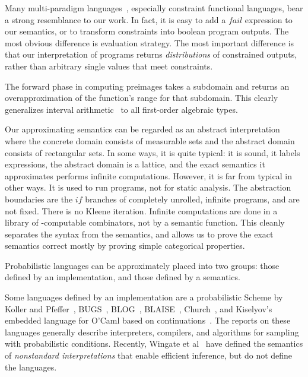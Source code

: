 Many multi-paradigm languages~\cite{cit:hanus-2007lp-multi-paradigm}, especially constraint functional languages, bear a strong resemblance to our work.
In fact, it is easy to add a $fail$ expression to our semantics, or to transform constraints into boolean program outputs.
The most obvious difference is evaluation strategy.
The most important difference is that our interpretation of programs returns \emph{distributions} of constrained outputs, rather than arbitrary single values that meet constraints.

The forward phase in computing preimages takes a subdomain and returns an overapproximation of the function's range for that subdomain.
This clearly generalizes interval arithmetic~\cite{cit:kearfott-1996eb-interval} to all first-order algebraic types.

Our approximating semantics can be regarded as an abstract interpretation~\cite{cit:cousot-1977popl-abstract-interpretation} where the concrete domain consists of measurable sets and the abstract domain consists of rectangular sets.
In some ways, it is quite typical: it is sound, it labels expressions, the abstract domain is a lattice, and the exact semantics it approximates performs infinite computations.
However, it is far from typical in other ways.
It is used to run programs, not for static analysis.
The abstraction boundaries are the $if$ branches of completely unrolled, infinite programs, and are not fixed.
There is no Kleene iteration.
Infinite computations are done in a library of \lzfclang-computable combinators, not by a semantic function.
This cleanly separates the syntax from the semantics, and allows us to prove the exact semantics correct mostly by proving simple categorical properties.

Probabilistic languages can be approximately placed into two groups: those defined by an implementation, and those defined by a semantics.

Some languages defined by an implementation are a probabilistic Scheme by Koller and Pfeffer~\cite{cit:koller-1997aaai-bayes-programs-short}, BUGS~\cite{cit:winbugs-language-short}, BLOG~\cite{cit:blog-language-short}, BLAISE~\cite{cit:blaise-language}, Church~\cite{cit:church-language-short}, and Kiselyov's embedded language for O'Caml based on continuations~\cite{cit:kiselyov-2008uai-monolingual}.
The reports on these languages generally describe interpreters, compilers, and algorithms for sampling with probabilistic conditions.
Recently, Wingate et al~\cite{cit:wingate-2011ais-lightweight,cit:wingate-2011nips-nonstandard} have defined the semantics of \emph{nonstandard interpretations} that enable efficient inference, but do not define the languages.

